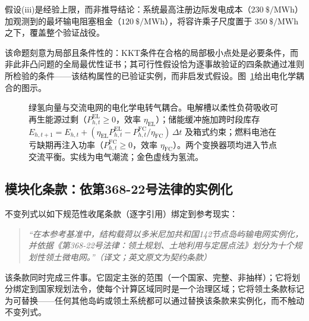 假设(iii)是经验上限，而非推导结论：系统最高注册边际发电成本（$230\ \text{\$}/\mathrm{MWh}$）加观测到的最坏输电阻塞租金（$120\ \text{\$}/\mathrm{MWh}$），将容许乘子尺度置于 $350\ \text{\$}/\mathrm{MWh}$ 之下，覆盖整个验证战役。

该命题刻意为局部且条件性的：KKT条件在合格的局部极小点处是必要条件，而非此非凸问题的全局最优性证书；其可行性假设恰为逐事故验证的四条款通过准则所检验的条件——该结构属性的已验证实例，而非启发式假设。图~\ref{fig:p2g_h2}给出电化学耦合的图示。

\begin{figure}[!t]
\centering
\resizebox{0.85\textwidth}{!}{}
\caption{绿氢向量与交流电网的电化学电转气耦合。电解槽以柔性负荷吸收可再生能源过剩（$P^{\mathrm{EL}}_{h,t} \ge 0$，效率 $\eta_{\mathrm{EL}}$）；储能缓冲施加跨时段库存 $E_{h,t+1} = E_{h,t} + (\eta_{\mathrm{EL}} P^{\mathrm{EL}}_{h,t} - P^{\mathrm{FC}}_{h,t}/\eta_{\mathrm{FC}})\,\Delta t$ 及箱式约束；燃料电池在亏缺期再注入功率（$P^{\mathrm{FC}}_{h,t} \ge 0$，效率 $\eta_{\mathrm{FC}}$）。两个变换器项均进入节点交流平衡。实线为电气潮流；金色虚线为氢流。}
\label{fig:p2g_h2}
\end{figure}

\subsection{模块化条款：依第368-22号法律的实例化}
\label{sub:clause}

不变列式以如下规范性收尾条款（逐字引用）绑定到参考现实：
\begin{quote}
\itshape “在本参考基准中，结构载荷以多米尼加共和国142节点岛屿输电网实例化，并依据《第368-22号法律：领土规划、土地利用与定居点法》划分为十个规划性领土微电网。”（译文；英文原文为契约条款）
\end{quote}

该条款同时完成三件事。它固定主张的范围（一个国家、完整、非抽样）；它将划分绑定到国家规划法令，使每个计算区域同时是一个治理区域；它将领土条款标记为可替换——任何其他岛屿或领土系统都可以通过替换该条款来实例化，而不触动不变列式。
